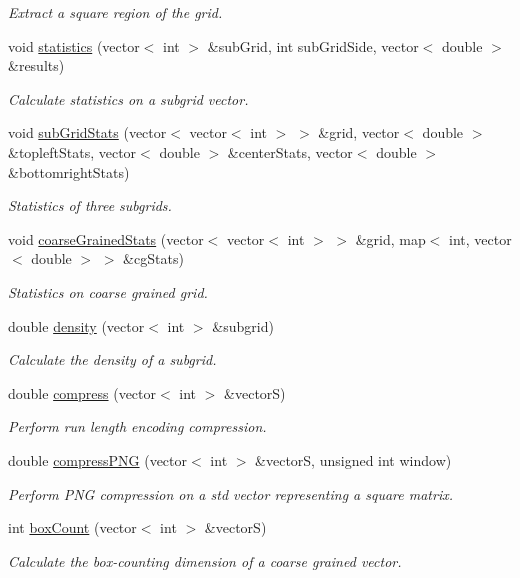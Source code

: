 \begin{DoxyCompactItemize}
\begin{DoxyCompactList}\small\item\em Extract a square region of the grid. \end{DoxyCompactList}\item 
void \hyperlink{classentropy_af3108d7ce02d1c592f283f117c0fe63f}{statistics} (vector$<$ int $>$ \&sub\+Grid, int sub\+Grid\+Side, vector$<$ double $>$ \&results)
\begin{DoxyCompactList}\small\item\em Calculate statistics on a subgrid vector. \end{DoxyCompactList}\item 
void \hyperlink{classentropy_ad8fb5db1c5168d71ee3c1a4badaa1c55}{sub\+Grid\+Stats} (vector$<$ vector$<$ int $>$ $>$ \&grid, vector$<$ double $>$ \&topleft\+Stats, vector$<$ double $>$ \&center\+Stats, vector$<$ double $>$ \&bottomright\+Stats)
\begin{DoxyCompactList}\small\item\em Statistics of three subgrids. \end{DoxyCompactList}\item 
void \hyperlink{classentropy_a1b96c4450456728759e0c7a607eccd6a}{coarse\+Grained\+Stats} (vector$<$ vector$<$ int $>$ $>$ \&grid, map$<$ int, vector$<$ double $>$ $>$ \&cg\+Stats)
\begin{DoxyCompactList}\small\item\em Statistics on coarse grained grid. \end{DoxyCompactList}\item 
double \hyperlink{classentropy_ada553811d6bcfb5ecb88691822d07834}{density} (vector$<$ int $>$ \&subgrid)
\begin{DoxyCompactList}\small\item\em Calculate the density of a subgrid. \end{DoxyCompactList}\item 
double \hyperlink{classentropy_afaf6890a65cab96d6f8ff6416f18a540}{compress} (vector$<$ int $>$ \&vectorS)
\begin{DoxyCompactList}\small\item\em Perform run length encoding compression. \end{DoxyCompactList}\item 
double \hyperlink{classentropy_afceb0407962f4114cae68d6f70dfb3ec}{compress\+P\+NG} (vector$<$ int $>$ \&vectorS, unsigned int window)
\begin{DoxyCompactList}\small\item\em Perform P\+NG compression on a std vector representing a square matrix. \end{DoxyCompactList}\item 
int \hyperlink{classentropy_a253fbd96c15371d3a19658c62a87bcc8}{box\+Count} (vector$<$ int $>$ \&vectorS)
\begin{DoxyCompactList}\small\item\em Calculate the box-\/counting dimension of a coarse grained vector. \end{DoxyCompactList}\end{DoxyCompactItemize}


